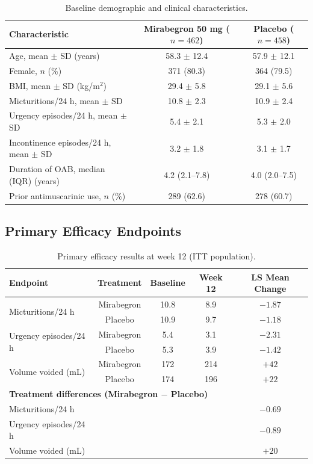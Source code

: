 \documentclass[
    language=english,
    doctype=clinical-report,
    institution=none,
]{../../omnilatex}
\begin{document}
\begin{table}[htbp]
    \centering
    \caption{Baseline demographic and clinical characteristics.}
    \label{tab:baseline}
    \begin{tabular}{@{}lcc@{}}
        \toprule
        Characteristic & Mirabegron 50 mg ($n = 462$) & Placebo ($n = 458$) \\
        \midrule
        Age, mean $\pm$ SD (years)         & 58.3 $\pm$ 12.4 & 57.9 $\pm$ 12.1 \\
        Female, $n$ (\%)                    & 371 (80.3)       & 364 (79.5) \\
        BMI, mean $\pm$ SD (kg/m$^2$)      & 29.4 $\pm$ 5.8   & 29.1 $\pm$ 5.6 \\
        Micturitions/24 h, mean $\pm$ SD   & 10.8 $\pm$ 2.3   & 10.9 $\pm$ 2.4 \\
        Urgency episodes/24 h, mean $\pm$ SD & 5.4 $\pm$ 2.1 & 5.3 $\pm$ 2.0 \\
        Incontinence episodes/24 h, mean $\pm$ SD & 3.2 $\pm$ 1.8 & 3.1 $\pm$ 1.7 \\
        Duration of OAB, median (IQR) (years) & 4.2 (2.1--7.8) & 4.0 (2.0--7.5) \\
        Prior antimuscarinic use, $n$ (\%)  & 289 (62.6)       & 278 (60.7) \\
        \bottomrule
    \end{tabular}
\end{table}

\subsection{Primary Efficacy Endpoints}

\begin{table}[htbp]
    \centering
    \caption{Primary efficacy results at week 12 (ITT population).}
    \label{tab:primary-efficacy}
    \begin{tabular}{@{}lcccc@{}}
        \toprule
        Endpoint & Treatment & Baseline & Week 12 & LS Mean Change \\
        \midrule
        \multirow{2}{*}{Micturitions/24 h} & Mirabegron & 10.8 & 8.9 & $-1.87$ \\
        & Placebo & 10.9 & 9.7 & $-1.18$ \\[6pt]
        \multirow{2}{*}{Urgency episodes/24 h} & Mirabegron & 5.4 & 3.1 & $-2.31$ \\
        & Placebo & 5.3 & 3.9 & $-1.42$ \\[6pt]
        \multirow{2}{*}{Volume voided (mL)} & Mirabegron & 172 & 214 & $+42$ \\
        & Placebo & 174 & 196 & $+22$ \\
        \midrule
        \multicolumn{5}{l}{\textbf{Treatment differences (Mirabegron $-$ Placebo)}} \\
        \midrule
        Micturitions/24 h        & & & & $-0.69$ \\
        Urgency episodes/24 h    & & & & $-0.89$ \\
        Volume voided (mL)       & & & & $+20$ \\
        \bottomrule
    \end{tabular}
\end{table}
\end{document}
